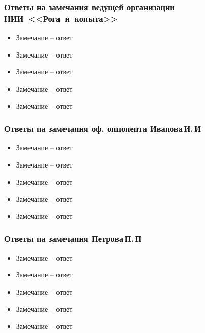 \begin{frame}
    \frametitle{Ответы на замечания ведущей организации НИИ~<<Рога~и~копыта>>}
    \begin{itemize}[beginpenalty=10000, midpenalty=10000, wide=\parindent, leftmargin=0pt]
        \item Замечание -- ответ
        \item Замечание -- ответ
        \item Замечание -- ответ
        \item Замечание -- ответ
        \item Замечание -- ответ
    \end{itemize}
\end{frame}

\begin{frame}
    \frametitle{Ответы на замечания оф. оппонента Иванова\,И.\,И}
    \begin{itemize}[beginpenalty=10000, midpenalty=10000, wide=\parindent, leftmargin=0pt]
        \item Замечание -- ответ
        \item Замечание -- ответ
        \item Замечание -- ответ
        \item Замечание -- ответ
        \item Замечание -- ответ
    \end{itemize}
\end{frame}

\begin{frame}
    \frametitle{Ответы на замечания Петрова\,П.\,П}
    \begin{itemize}[beginpenalty=10000, midpenalty=10000, wide=\parindent, leftmargin=0pt]
        \item Замечание -- ответ
        \item Замечание -- ответ
        \item Замечание -- ответ
        \item Замечание -- ответ
        \item Замечание -- ответ
    \end{itemize}
\end{frame}
